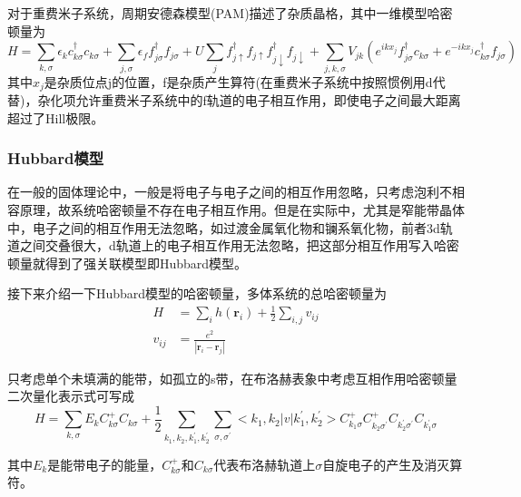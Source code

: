 对于重费米子系统，周期安德森模型(PAM)描述了杂质晶格，其中一维模型哈密顿量为
$$
H=\sum_{k, \sigma} \epsilon_{k} c_{k \sigma}^{\dagger} c_{k \sigma}+\sum_{j, \sigma} \epsilon_{f} f_{j \sigma}^{\dagger} f_{j \sigma}+U \sum_{j} f_{j \uparrow}^{\dagger} f_{j \uparrow} f_{j \downarrow}^{\dagger} f_{j \downarrow}+\sum_{j, k, \sigma} V_{j k}\left(e^{i k x_{j}} f_{j \sigma}^{\dagger} c_{k \sigma}+e^{-i k x_{j}} c_{k \sigma}^{\dagger} f_{j \sigma}\right)
$$
其中$x_j$是杂质位点j的位置，f是杂质产生算符(在重费米子系统中按照惯例用d代替)，杂化项允许重费米子系统中的f轨道的电子相互作用，即使电子之间最大距离超过了Hill极限。

\subsubsection{Hubbard模型}
在一般的固体理论中，一般是将电子与电子之间的相互作用忽略，只考虑泡利不相容原理，故系统哈密顿量不存在电子相互作用。但是在实际中，尤其是窄能带晶体中，电子之间的相互作用无法忽略，如过渡金属氧化物和镧系氧化物，前者3d轨道之间交叠很大，d轨道上的电子相互作用无法忽略，把这部分相互作用写入哈密顿量就得到了强关联模型即Hubbard模型。

接下来介绍一下Hubbard模型的哈密顿量，多体系统的总哈密顿量为
\begin{align*}
    H&=\sum_i h(\textbf{r}_i)+\frac{1}{2}\sum_{i,j}v_{ij}\\
    v_{ij}&=\frac{e^2}{|\textbf{r}_i-\textbf{r}_j|}
\end{align*}

只考虑单个未填满的能带，如孤立的s带，在布洛赫表象中考虑互相作用哈密顿量二次量化表示式可写成
\begin{equation}
    H=\sum_{k, \sigma} E_{k} C_{k \sigma}^{+} C_{k \sigma}+\frac{1}{2} \sum_{k_{1}, k_{2}, k_{1}^{\prime}, k_{2}^{\prime}} \sum_{\sigma, \sigma^{\prime}}<k_{1}, k_{2}|v| k_{1}^{\prime}, k_{2}^{\prime}>C_{k_{1} \sigma}^{+} C_{k_{2} \sigma^{\prime}}^{+} C_{k^{\prime}_2 \sigma^{\prime}} C_{k^{\prime}_1 \sigma}
    \label{1.1}
\end{equation}

其中$E_k$是能带电子的能量，$C^+_{k \sigma}$和$C_{k \sigma}$代表布洛赫轨道上$\sigma$自旋电子的产生及消灭算符。


